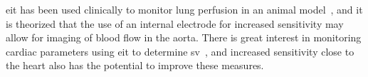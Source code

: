 %
%
%
%
%



\acrshort{eit} has been used clinically to monitor lung perfusion 
in an animal model~\parencite{Leonhardt2012,Nguyen2012}, and it is theorized that 
the use of an internal electrode for increased sensitivity may allow for 
imaging of blood flow in the aorta. 
There is great interest in monitoring cardiac parameters
using \acrshort{eit} to determine \acrfull{sv}~\parencite{Proenca2017,Braun2018}, and increased
sensitivity close to the heart also has the potential to improve
these measures.

